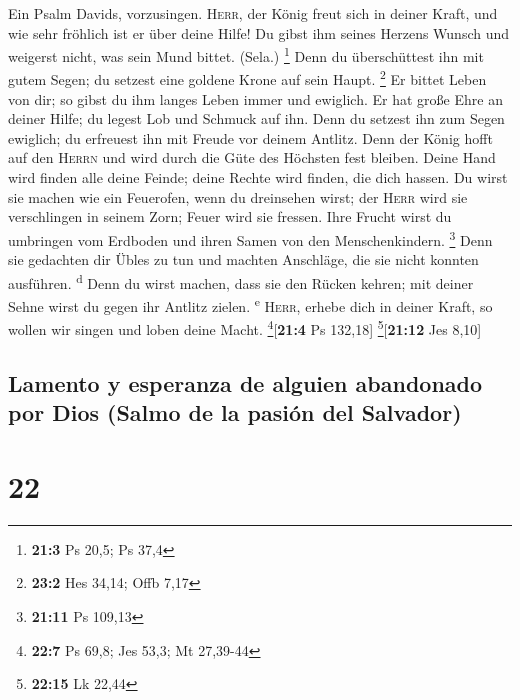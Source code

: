  Ein Psalm Davids, vorzusingen. 
\textsc{Herr}, der König freut sich in deiner Kraft, und wie sehr
fröhlich ist er über deine Hilfe!  Du gibst ihm seines
Herzens Wunsch und weigerst nicht, was sein Mund bittet. (Sela.)
\footnote{\textbf{21:3} Ps 20,5; Ps 37,4}  Denn du
überschüttest ihn mit gutem Segen; du setzest eine goldene Krone auf
sein Haupt. \footnote{\textbf{23:2} Hes 34,14; Offb 7,17} 
Er bittet Leben von dir; so gibst du ihm langes Leben immer und
ewiglich.  Er hat große Ehre an deiner Hilfe; du legest
Lob und Schmuck auf ihn.  Denn du setzest ihn zum Segen
ewiglich; du erfreuest ihn mit Freude vor deinem Antlitz. 
Denn der König hofft auf den \textsc{Herrn} und wird durch die Güte des
Höchsten fest bleiben.  Deine Hand wird finden alle deine
Feinde; deine Rechte wird finden, die dich hassen.  Du
wirst sie machen wie ein Feuerofen, wenn du dreinsehen wirst; der
\textsc{Herr} wird sie verschlingen in seinem Zorn; Feuer wird sie
fressen.  Ihre Frucht wirst du umbringen vom Erdboden und
ihren Samen von den Menschenkindern. \footnote{\textbf{21:11} Ps 109,13}
 Denn sie gedachten dir Übles zu tun und machten
Anschläge, die sie nicht konnten ausführen. \textsuperscript{d}
 Denn du wirst machen, dass sie den Rücken kehren; mit
deiner Sehne wirst du gegen ihr Antlitz zielen. \textsuperscript{e}
 \textsc{Herr}, erhebe dich in deiner Kraft, so wollen
wir singen und loben deine Macht. \footnote{\textbf{22:7} Ps 69,8; Jes
  53,3; Mt 27,39-44}{[}\textbf{21:4} Ps 132,18{]}
\footnote{\textbf{22:15} Lk 22,44}{[}\textbf{21:12} Jes 8,10{]}

\hypertarget{lamento-y-esperanza-de-alguien-abandonado-por-dios-salmo-de-la-pasiuxf3n-del-salvador}{%
\subsection{Lamento y esperanza de alguien abandonado por Dios (Salmo de
la pasión del
Salvador)}\label{lamento-y-esperanza-de-alguien-abandonado-por-dios-salmo-de-la-pasiuxf3n-del-salvador}}

\hypertarget{section-21}{%
\section{22}\label{section-21}}

